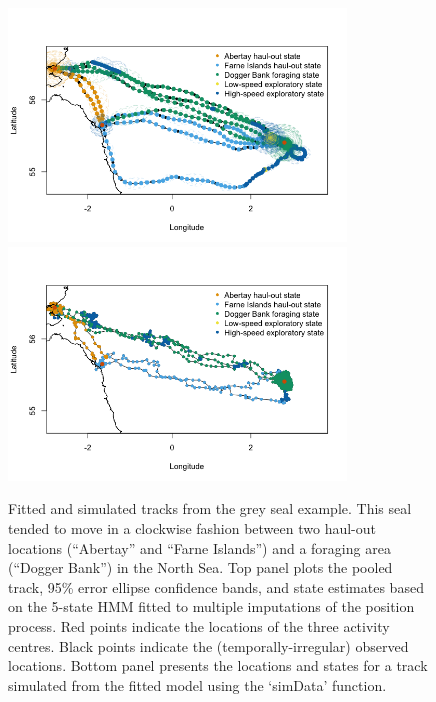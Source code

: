 \documentclass[12pt]{article}\usepackage[]{graphicx}\usepackage[]{color}
\begin{document}
\begin{figure}[htbp]
  \centering
    \includegraphics[width=0.8\textwidth]{plot_greySealResults1.png}\\
    \includegraphics[width=0.8\textwidth]{plot_greySealResults2.png}
  \caption{Fitted and simulated tracks from the grey seal example. This seal tended to move in a clockwise fashion between two haul-out locations (``Abertay'' and ``Farne Islands'') and a foraging area (``Dogger Bank'') in the North Sea. Top panel plots the pooled track, 95\% error ellipse confidence bands, and state estimates based on the 5-state HMM fitted to multiple imputations of the position process. Red points indicate the locations of the three activity centres. Black points indicate the (temporally-irregular) observed locations. Bottom panel presents the locations and states for a track simulated from the fitted model using the `simData' function.}
  \label{fig:greySealStateSims}
\end{figure}
\end{document}

